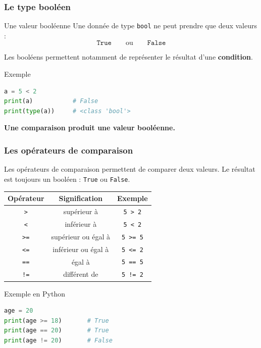 \documentclass[10pt]{beamer}
\begin{document}
\begin{frame}[containsverbatim]
\frametitle{Le type booléen}

\begin{block}{Une valeur booléenne}
Une donnée de type \texttt{bool} ne peut prendre que deux valeurs :
\[
\texttt{True} \qquad \text{ou} \qquad \texttt{False}
\]
\end{block}

\vspace{0.2cm}

Les booléens permettent notamment de représenter le résultat
d'une \textbf{condition}.

\begin{exampleblock}{Exemple}
\begin{lstlisting}[language=Python]
a = 5 < 2
print(a)           # False
print(type(a))     # <class 'bool'>
\end{lstlisting}
\end{exampleblock}

\vspace{0.15cm}

\begin{center}
\textbf{Une comparaison produit une valeur booléenne.}
\end{center}

\end{frame}


\begin{frame}[containsverbatim]
\frametitle{Les opérateurs de comparaison}

Les opérateurs de comparaison permettent de comparer deux valeurs.
Le résultat est toujours un booléen : \texttt{True} ou \texttt{False}.

\vspace{0.2cm}

\begin{center}
\begin{tabular}{c|c|c}
\textbf{Opérateur} & \textbf{Signification} & \textbf{Exemple} \\ \hline
\texttt{>}  & supérieur à & \texttt{5 > 2} \\
\texttt{<}  & inférieur à & \texttt{5 < 2} \\
\texttt{>=} & supérieur ou égal à & \texttt{5 >= 5} \\
\texttt{<=} & inférieur ou égal à & \texttt{5 <= 2} \\
\texttt{==} & égal à & \texttt{5 == 5} \\
\texttt{!=} & différent de & \texttt{5 != 2}
\end{tabular}
\end{center}

\vspace{0.25cm}

\begin{exampleblock}{Exemple en Python}
\begin{lstlisting}[language=Python]
age = 20
print(age >= 18)       # True
print(age == 20)       # True
print(age != 20)       # False
\end{lstlisting}
\end{exampleblock}

\end{frame}
\end{document}
